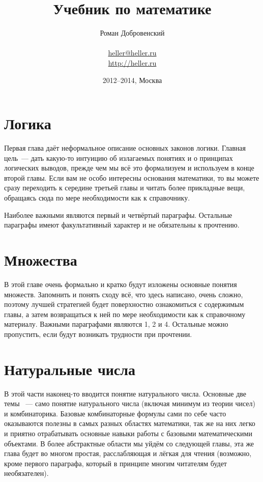 \documentclass[a5paper,10pt,pagesize,DIV=classic]{scrbook}
\theoremstyle{plain}
\theoremstyle{definition}
\begin{document}
\title{Учебник по математике}
\author{Роман Добровенский\\ \\ \url{heller@heller.ru}\\ \url{http://heller.ru}}
\date{2012--2014, Москва}
\maketitle

\tableofcontents



\chapter{Логика}
Первая глава даёт неформальное описание основных законов логики. Главная цель~--- дать какую-то интуицию об излагаемых понятиях и о принципах логических выводов, прежде чем мы всё это формализуем и используем в конце второй главы. Если вам не особо интересны основания математики, то вы можете сразу переходить к середине третьей главы и читать более прикладные вещи, обращаясь сюда по мере необходимости как к справочнику.

Наиболее важными являются первый и четвёртый параграфы. Остальные параграфы имеют факультативный характер и не обязательны к прочтению.







%
%




\chapter{Множества}
В этой главе очень формально и кратко будут изложены основные понятия множеств. Запомнить и понять сходу всё, что здесь написано, очень сложно, поэтому лучшей стратегией будет поверхностно ознакомиться с содержимым главы, а затем возвращаться к ней по мере необходимости как к справочному материалу. Важными параграфами являются 1, 2 и 4. Остальные можно пропустить, если будут возникать трудности при прочтении.






%



\chapter{Натуральные числа}
В этой части наконец-то вводится понятие натурального числа. Основные две темы ~--- само понятие натурального числа (включая минимум из теории чисел) и комбинаторика. Базовые комбинаторные формулы сами по себе часто оказываются полезны в самых разных областях математики, так же на них легко и приятно отрабатывать основные навыки работы с базовыми математическими объектами. В более абстрактные области мы уйдём со следующей главы, эта же глава будет во многом простая, расслабляющая и лёгкая для чтения (возможно, кроме первого параграфа, который в принципе многим читателям будет необязателен).
\end{document}

